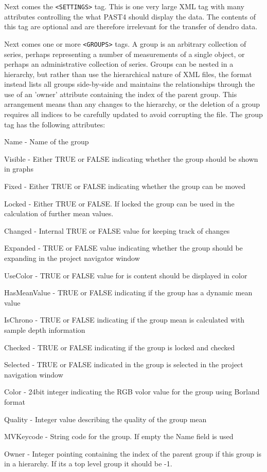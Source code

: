 Next comes the \verb|<SETTINGS>| tag. This is one very large XML tag with many attributes controlling the what PAST4 should display the data. The contents of this tag are optional and are therefore irrelevant for the transfer of dendro data.

Next comes one or more \verb|<GROUPS>| tags. A group is an arbitrary collection of series, perhaps representing a number of measurements of a single object, or perhaps an administrative collection of series. Groups can be nested in a hierarchy, but rather than use the hierarchical nature of XML files, the format instead lists all groups side-by-side and maintains the relationships through the use of an 'owner' attribute containing the index of the parent group. This arrangement means than any changes to the hierarchy, or the deletion of a group requires all indices to be carefully updated to avoid corrupting the file. The group tag has the following attributes:

\begin{itemize*}
    \item  Name - Name of the group
    \item  Visible - Either TRUE or FALSE indicating whether the group should be shown in graphs
    \item  Fixed - Either TRUE or FALSE indicating whether the group can be moved
    \item  Locked - Either TRUE or FALSE. If locked the group can be used in the calculation of further mean values.
    \item  Changed - Internal TRUE or FALSE value for keeping track of changes
    \item  Expanded - TRUE or FALSE value indicating whether the group should be expanding in the project navigator window
    \item  UseColor - TRUE or FALSE value for is content should be displayed in color
    \item  HasMeanValue - TRUE or FALSE indicating if the group has a dynamic mean value
    \item  IsChrono - TRUE or FALSE indicating if the group mean is calculated with sample depth information
    \item  Checked - TRUE or FALSE indicating if the group is locked and checked
    \item  Selected - TRUE or FALSE indicated in the group is selected in the project navigation window
    \item  Color - 24bit integer indicating the RGB volor value for the group using Borland format
    \item  Quality - Integer value describing the quality of the group mean
    \item  MVKeycode - String code for the group. If empty the Name field is used
    \item  Owner - Integer pointing containing the index of the parent group if this group is in a hierarchy. If its a top level group it should be -1. 
\end{itemize*}

